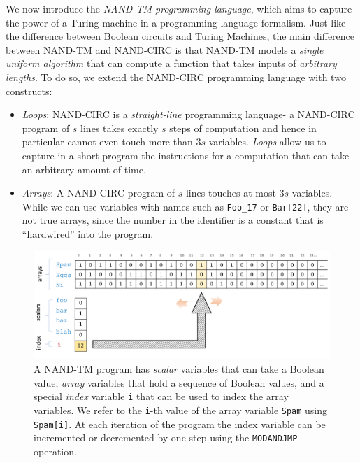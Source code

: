 We now introduce the \emph{NAND-TM programming language}, which aims to
capture the power of a Turing machine in a programming language
formalism. Just like the difference between Boolean circuits and Turing
Machines, the main difference between NAND-TM and NAND-CIRC is that
NAND-TM models a \emph{single uniform algorithm} that can compute a
function that takes inputs of \emph{arbitrary lengths}. To do so, we
extend the NAND-CIRC programming language with two constructs:

\begin{itemize}
\item
  \emph{Loops}: NAND-CIRC is a \emph{straight-line} programming
  language- a NAND-CIRC program of \(s\) lines takes exactly \(s\) steps
  of computation and hence in particular cannot even touch more than
  \(3s\) variables. \emph{Loops} allow us to capture in a short program
  the instructions for a computation that can take an arbitrary amount
  of time.
\item
  \emph{Arrays}: A NAND-CIRC program of \(s\) lines touches at most
  \(3s\) variables. While we can use variables with names such as
  \texttt{Foo\_17} or \texttt{Bar[22]}, they are not true arrays, since
  the number in the identifier is a constant that is ``hardwired'' into
  the program.
\end{itemize}


\begin{figure}
\centering
\includegraphics[width=\textwidth, height=0.25\paperheight, keepaspectratio]{../figure/nandtmprog.png}
\caption{A NAND-TM program has \emph{scalar} variables that can take a
Boolean value, \emph{array} variables that hold a sequence of Boolean
values, and a special \emph{index} variable \texttt{i} that can be used
to index the array variables. We refer to the \texttt{i}-th value of the
array variable \texttt{Spam} using \texttt{Spam[i]}. At each iteration
of the program the index variable can be incremented or decremented by
one step using the \texttt{MODANDJMP} operation.}
\label{nandtmfig}
\end{figure}

